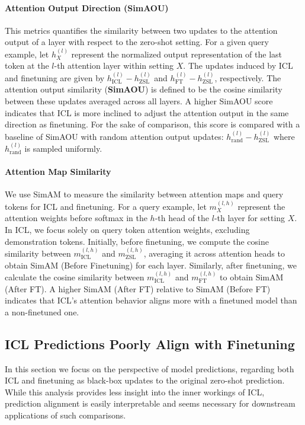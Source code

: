 \paragraph{Attention Output Direction (SimAOU)}
This metrics quantifies the similarity between two updates to the attention output of a layer with respect to the zero-shot setting. 
For a given query example, let $h^{(l)}_X$ represent the normalized output representation of the last token at the $l$-th attention layer within setting $X$.
The updates induced by ICL and finetuning are given by $h^{(l)}_{\text{ICL}} - h^{(l)}_{\text{ZSL}}$ and $h^{(l)}_{\text{FT}} - h^{(l)}_{\text{ZSL}}$, respectively.
The attention output similarity (\textbf{SimAOU}) is defined to be the cosine similarity between these updates averaged across all layers.
A higher SimAOU score indicates that ICL is more inclined to adjust the attention output in the same direction as finetuning.
For the sake of comparison, this score is compared with a baseline of SimAOU with random attention output updates: $h^{(l)}_{\text{rand}} - h^{(l)}_{\text{ZSL}}$ where $h^{(l)}_{\text{rand}}$ is sampled uniformly.

\paragraph{Attention Map Similarity}
We use SimAM to measure the similarity between attention maps and query tokens for ICL and finetuning.
For a query example, let $m^{(l,h)}_X$ represent the attention weights before softmax in the $h$-th head of the $l$-th layer for setting $X$. In ICL, we focus solely on query token attention weights, excluding demonstration tokens. Initially, before finetuning, we compute the cosine similarity between $m^{(l,h)}_{\text{ICL}}$ and $m^{(l,h)}_{\text{ZSL}}$, averaging it across attention heads to obtain SimAM (Before Finetuning) for each layer.
Similarly, after finetuning, we calculate the cosine similarity between $m^{(l,h)}_{\text{ICL}}$ and $m^{(l,h)}_{\text{FT}}$ to obtain SimAM (After FT). A higher SimAM (After FT) relative to SimAM (Before FT) indicates that ICL's attention behavior aligns more with a finetuned model than a non-finetuned one.


\subsection{ICL Predictions Poorly Align with Finetuning}


In this section we focus on the perspective of model predictions, regarding both ICL and finetuning as black-box updates to the original zero-shot prediction.
While this analysis provides less insight into the inner workings of ICL, prediction alignment is easily interpretable and seems necessary for downstream applications of such comparisons.

